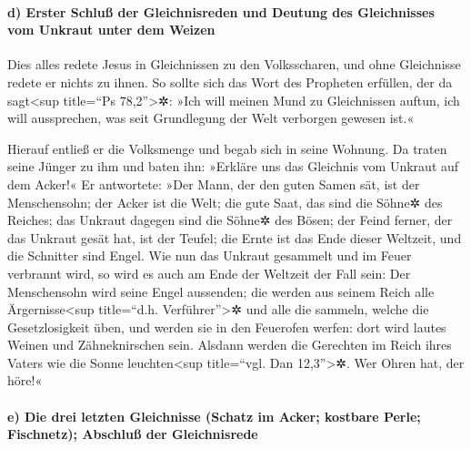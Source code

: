 \hypertarget{d-erster-schluuxdf-der-gleichnisreden-und-deutung-des-gleichnisses-vom-unkraut-unter-dem-weizen}{%
\paragraph{d) Erster Schluß der Gleichnisreden und Deutung des
Gleichnisses vom Unkraut unter dem
Weizen}\label{d-erster-schluuxdf-der-gleichnisreden-und-deutung-des-gleichnisses-vom-unkraut-unter-dem-weizen}}

 Dies alles redete Jesus in Gleichnissen zu den
Volksscharen, und ohne Gleichnisse redete er nichts zu ihnen.
 So sollte sich das Wort des Propheten erfüllen, der da
sagt\textless sup title=``Ps 78,2''\textgreater✲: »Ich will meinen Mund
zu Gleichnissen auftun, ich will aussprechen, was seit Grundlegung der
Welt verborgen gewesen ist.«

 Hierauf entließ er die Volksmenge und begab sich in
seine Wohnung. Da traten seine Jünger zu ihm und baten ihn: »Erkläre uns
das Gleichnis vom Unkraut auf dem Acker!«  Er antwortete:
»Der Mann, der den guten Samen sät, ist der Menschensohn;
 der Acker ist die Welt; die gute Saat, das sind die
Söhne✲ des Reiches; das Unkraut dagegen sind die Söhne✲ des Bösen;
 der Feind ferner, der das Unkraut gesät hat, ist der
Teufel; die Ernte ist das Ende dieser Weltzeit, und die Schnitter sind
Engel.  Wie nun das Unkraut gesammelt und im Feuer
verbrannt wird, so wird es auch am Ende der Weltzeit der Fall sein:
 Der Menschensohn wird seine Engel aussenden; die werden
aus seinem Reich alle Ärgernisse\textless sup title=``d.h.
Verführer''\textgreater✲ und alle die sammeln, welche die
Gesetzlosigkeit üben,  und werden sie in den Feuerofen
werfen: dort wird lautes Weinen und Zähneknirschen sein. 
Alsdann werden die Gerechten im Reich ihres Vaters wie die Sonne
leuchten\textless sup title=``vgl. Dan 12,3''\textgreater✲. Wer Ohren
hat, der höre!«

\hypertarget{e-die-drei-letzten-gleichnisse-schatz-im-acker-kostbare-perle-fischnetz-abschluuxdf-der-gleichnisrede}{%
\paragraph{e) Die drei letzten Gleichnisse (Schatz im Acker; kostbare
Perle; Fischnetz); Abschluß der
Gleichnisrede}\label{e-die-drei-letzten-gleichnisse-schatz-im-acker-kostbare-perle-fischnetz-abschluuxdf-der-gleichnisrede}}

